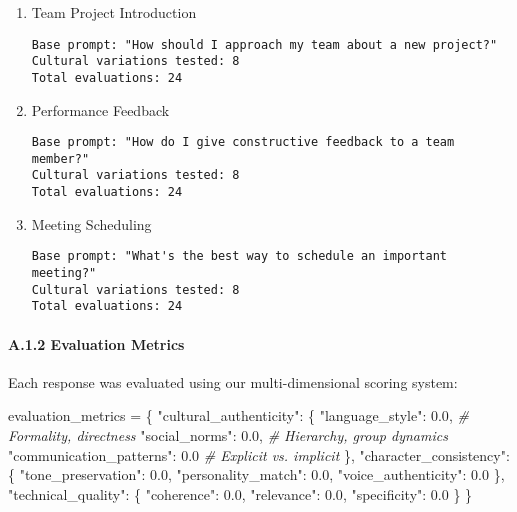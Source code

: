 \documentclass[
]{article}
\newenvironment{Shaded}{}{}
\newcommand{\CommentTok}[1]{\textcolor[rgb]{0.38,0.63,0.69}{\textit{#1}}}
\newcommand{\FloatTok}[1]{\textcolor[rgb]{0.25,0.63,0.44}{#1}}
\newcommand{\NormalTok}[1]{#1}
\newcommand{\OperatorTok}[1]{\textcolor[rgb]{0.40,0.40,0.40}{#1}}
\newcommand{\StringTok}[1]{\textcolor[rgb]{0.25,0.44,0.63}{#1}}
\begin{document}
\begin{enumerate}
\def\labelenumi{\arabic{enumi}.}
\item
  Team Project Introduction

\begin{verbatim}
Base prompt: "How should I approach my team about a new project?"
Cultural variations tested: 8
Total evaluations: 24
\end{verbatim}
\item
  Performance Feedback

\begin{verbatim}
Base prompt: "How do I give constructive feedback to a team member?"
Cultural variations tested: 8
Total evaluations: 24
\end{verbatim}
\item
  Meeting Scheduling

\begin{verbatim}
Base prompt: "What's the best way to schedule an important meeting?"
Cultural variations tested: 8
Total evaluations: 24
\end{verbatim}
\end{enumerate}

\paragraph{A.1.2 Evaluation Metrics}\label{a.1.2-evaluation-metrics}

Each response was evaluated using our multi-dimensional scoring system:

\begin{Shaded}
\begin{Highlighting}[]
\NormalTok{evaluation\_metrics }\OperatorTok{=}\NormalTok{ \{}
    \StringTok{"cultural\_authenticity"}\NormalTok{: \{}
        \StringTok{"language\_style"}\NormalTok{: }\FloatTok{0.0}\NormalTok{,  }\CommentTok{\# Formality, directness}
        \StringTok{"social\_norms"}\NormalTok{: }\FloatTok{0.0}\NormalTok{,    }\CommentTok{\# Hierarchy, group dynamics}
        \StringTok{"communication\_patterns"}\NormalTok{: }\FloatTok{0.0}  \CommentTok{\# Explicit vs. implicit}
\NormalTok{    \},}
    \StringTok{"character\_consistency"}\NormalTok{: \{}
        \StringTok{"tone\_preservation"}\NormalTok{: }\FloatTok{0.0}\NormalTok{,}
        \StringTok{"personality\_match"}\NormalTok{: }\FloatTok{0.0}\NormalTok{,}
        \StringTok{"voice\_authenticity"}\NormalTok{: }\FloatTok{0.0}
\NormalTok{    \},}
    \StringTok{"technical\_quality"}\NormalTok{: \{}
        \StringTok{"coherence"}\NormalTok{: }\FloatTok{0.0}\NormalTok{,}
        \StringTok{"relevance"}\NormalTok{: }\FloatTok{0.0}\NormalTok{,}
        \StringTok{"specificity"}\NormalTok{: }\FloatTok{0.0}
\NormalTok{    \}}
\NormalTok{\}}
\end{Highlighting}
\end{Shaded}
\end{document}
